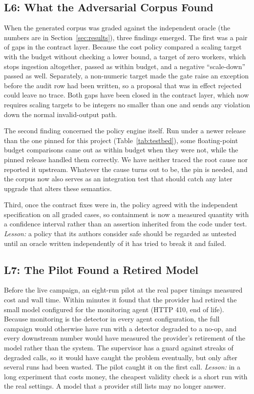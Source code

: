 \subsection{L6: What the Adversarial Corpus Found}\label{sec:l6}
When the generated corpus was graded against the independent oracle (the numbers are in
Section~\ref{sec:results}), three findings emerged. The first was a pair of gaps in the contract
layer. Because the cost policy compared a scaling target with the budget without checking a lower
bound, a target of zero workers, which stops ingestion altogether, passed as within budget, and a
negative ``scale-down'' passed as well. Separately, a non-numeric target made the gate raise an
exception before the audit row had been written, so a proposal that was in effect rejected could leave
no trace. Both gaps have been closed in the contract layer, which now requires scaling targets to be
integers no smaller than one and sends any violation down the normal invalid-output path.

The second finding concerned the policy engine itself. Run under a newer release than the one pinned
for this project (Table~\ref{tab:testbed}), some floating-point budget comparisons came out as within
budget when they were not, while the pinned release handled them correctly. We have neither traced
the root cause nor reported it upstream. Whatever the cause turns out to be, the pin is needed, and the
corpus now also serves as an integration test that should catch any later upgrade that alters these
semantics.

Third, once the contract fixes were in, the policy agreed with the independent specification on all
graded cases, so containment is now a measured quantity with a confidence interval rather than an
assertion inherited from the code under test. \emph{Lesson:} a policy that its authors consider safe
should be regarded as untested until an oracle written independently of it has tried to break it and
failed.

\subsection{L7: The Pilot Found a Retired Model}\label{sec:l7}
Before the live campaign, an eight-run pilot at the real paper timings measured cost and wall time.
Within minutes it found that the provider had retired the small model configured for the monitoring
agent (HTTP 410, end of life). Because monitoring is the detector in every agent configuration, the
full campaign would otherwise have run with a detector degraded to a no-op, and every downstream
number would have measured the provider's retirement of the model rather than the system. The
supervisor has a guard against streaks of degraded calls, so it would have caught the problem
eventually, but only after several runs had been wasted. The pilot caught it on the first call.
\emph{Lesson:} in a long experiment that costs money, the cheapest validity check is a short run with
the real settings. A model that a provider still lists may no longer answer.

